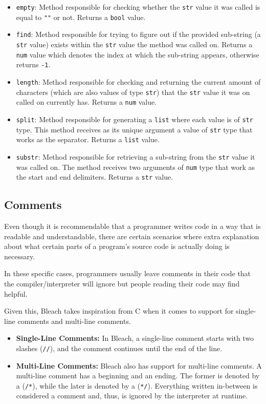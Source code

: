\begin{itemize}
    \begin{itemize}
        \item \texttt{empty}: Method responsible for checking whether the \texttt{str} value it was called is equal to \texttt{""} or not. Returns a \texttt{bool} value.
        \item \texttt{find}: Method responsible for trying to figure out if the provided sub-string (a \texttt{str} value) exists within the \texttt{str} value the method was called on. Returns a \texttt{num} value which denotes the index at which the sub-string appears, otherwise returns \texttt{-1}. 
        \item \texttt{length}: Method responsible for checking and returning the current amount of characters (which are also values of type \texttt{str}) that the \texttt{str} value it was on called on currently has. Returns a \texttt{num} value.
        \item \texttt{split}: Method responsible for generating a \texttt{list} where each value is of \texttt{str} type. This method receives as its unique argument a value of \texttt{str} type that works as the separator. Returns a \texttt{list} value.
        \item \texttt{substr}: Method responsible for retrieving a sub-string from the \texttt{str} value it was called on. The method receives two arguments of \texttt{num} type that work as the start and end delimiters. Returns a \texttt{str} value.
    \end{itemize}

\end{itemize}

\subsection{Comments}
Even though it is recommendable that a programmer writes code in a way that is readable and understandable, there are certain scenarios where extra explanation about what certain parts of a program's source code is actually doing is necessary.

In these specific cases, programmers usually leave comments in their code that the compiler/interpreter will ignore but people reading their code may find helpful.

Given this, Bleach takes inspiration from C \cite{kernighan1988c} when it comes to support for single-line comments and multi-line comments.

\begin{itemize}
    \item \textbf{Single-Line Comments:} In Bleach, a single-line comment starts with two slashes (\texttt{//}), and the comment continues until the end of the line.
    \item \textbf{Multi-Line Comments:} Bleach also has support for multi-line comments. A multi-line comment has a beginning and an ending. The former is denoted by a (\texttt{/*}), while the later is denoted by a (\texttt{*/}). Everything written in-between is considered a comment and, thus, is ignored by the interpreter at runtime.
\end{itemize}

